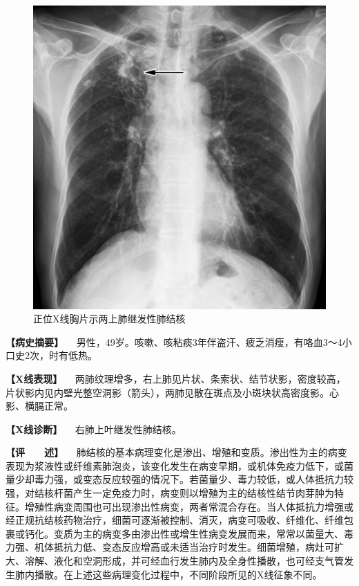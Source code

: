 \begin{figure}[!htbp]
 \centering
 \includegraphics{./images/Image00154.jpg}
 \captionsetup{justification=centering}
 \caption{正位X线胸片示两上肺继发性肺结核}
 \label{fig3-5-2}
  \end{figure} 

\textbf{【病史摘要】}
　男性，49岁。咳嗽、咳粘痰3年伴盗汗、疲乏消瘦，有咯血3～4小口史2次，时有低热。

\textbf{【X线表现】}
　两肺纹理增多，右上肺见片状、条索状、结节状影，密度较高，片状影内见内壁光整空洞影（箭头），两肺见散在斑点及小斑块状高密度影。心影、横膈正常。

\textbf{【X线诊断】} 　右肺上叶继发性肺结核。

\textbf{【评　　述】}
　肺结核的基本病理变化是渗出、增殖和变质。渗出性为主的病变表现为浆液性或纤维素肺泡炎，该变化发生在病变早期，或机体免疫力低下，或菌量少却毒力强，或变态反应较强的情况下。若菌量少、毒力较低，或人体抵抗力较强，对结核杆菌产生一定免疫力时，病变则以增殖为主的结核性结节肉芽肿为特征。增殖性病变周围也可出现渗出性病变，两者常混合存在。当人体抵抗力增强或经正规抗结核药物治疗，细菌可逐渐被控制、消灭，病变可吸收、纤维化、纤维包裹或钙化。变质为主的病变多由渗出性或增生性病变发展而来，常常以菌量大、毒力强、机体抵抗力低、变态反应增高或未适当治疗时发生。细菌增殖，病灶可扩大、溶解、液化和空洞形成，并可经血行发生肺内及全身性播散，也可经支气管发生肺内播散。在上述这些病理变化过程中，不同阶段所见的X线征象不同。

